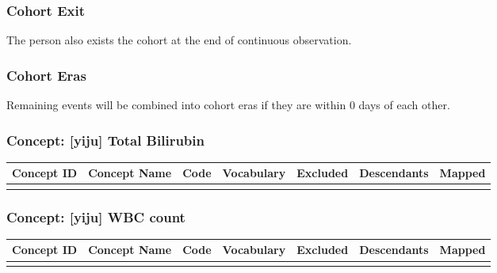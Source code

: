 \documentclass[
  12pt,
]{article}
\begin{document}
\subsubsection{Cohort Exit}\label{cohort-exit-2}

The person also exists the cohort at the end of continuous observation.

\subsubsection{Cohort Eras}\label{cohort-eras-2}

Remaining events will be combined into cohort eras if they are within 0 days of each other.

\subsubsection{Concept: {[}yiju{]} Total Bilirubin}\label{concept-yiju-total-bilirubin}

\begingroup\fontsize{8}{10}\selectfont

\begin{longtable}{>{\raggedright\arraybackslash}p{5em}>{\raggedright\arraybackslash}p{20em}lllll}
\toprule
Concept ID & Concept Name & Code & Vocabulary & Excluded & Descendants & Mapped\\
\midrule
\cellcolor{gray!10}{3024128} & \cellcolor{gray!10}{Bilirubin.total [Mass/volume] in Serum or Plasma} & \cellcolor{gray!10}{1975-2} & \cellcolor{gray!10}{LOINC} & \cellcolor{gray!10}{NO} & \cellcolor{gray!10}{NO} & \cellcolor{gray!10}{NO}\\
\bottomrule
\end{longtable}
\endgroup{}

\subsubsection{Concept: {[}yiju{]} WBC count}\label{concept-yiju-wbc-count}

\begingroup\fontsize{8}{10}\selectfont

\begin{longtable}{>{\raggedright\arraybackslash}p{5em}>{\raggedright\arraybackslash}p{20em}lllll}
\toprule
Concept ID & Concept Name & Code & Vocabulary & Excluded & Descendants & Mapped\\
\midrule
\cellcolor{gray!10}{3000905} & \cellcolor{gray!10}{Leukocytes [\#/volume] in Blood by Automated count} & \cellcolor{gray!10}{6690-2} & \cellcolor{gray!10}{LOINC} & \cellcolor{gray!10}{NO} & \cellcolor{gray!10}{NO} & \cellcolor{gray!10}{NO}\\
\bottomrule
\end{longtable}
\endgroup{}
\end{document}
